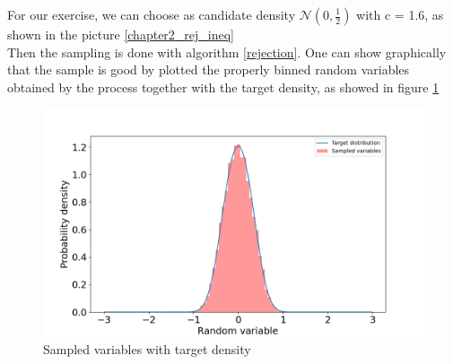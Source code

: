 For our exercise, we can choose as candidate density $\mathcal{N}(0,\frac{1}{2})$ with c = 1.6, as shown in the picture \ref{chapter2_rej_ineq} \\

Then the sampling is done with algorithm \ref{rejection}. 
One can show graphically that the sample is good by plotted the properly binned random variables obtained by the process together with the 
target density, as showed in figure \ref{chapter2_rej_variables}

\begin{figure}[t!]
\centering
\includegraphics[width=1\textwidth]{FIG/exercise_2_images/rejection_sampling_verify.png}
\caption{Sampled variables with target density}
\label{chapter2_rej_variables}
\end{figure}
        